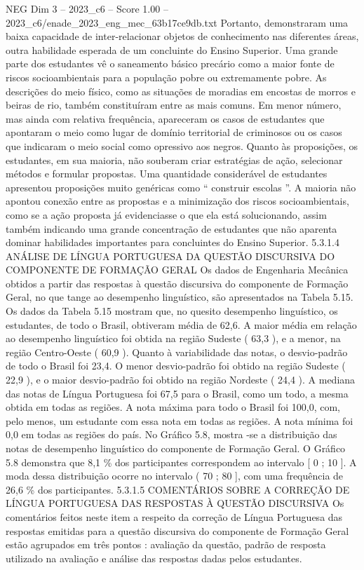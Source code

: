 \begin{textsample}{NEG Dim 3 – 2023\_c6 – Score 1.00 – 2023\_c6/enade\_2023\_eng\_mec\_63b17ce9db.txt}
Portanto, demonstraram uma baixa capacidade de inter-relacionar objetos de conhecimento nas diferentes áreas, outra habilidade esperada de um concluinte do Ensino Superior.
Uma grande parte dos estudantes vê o saneamento básico precário como a maior fonte de riscos socioambientais para a população pobre ou extremamente pobre.
As descrições do meio físico, como as situações de moradias em encostas de morros e beiras de rio, também constituíram entre as mais comuns.
Em menor número, mas ainda com relativa frequência, apareceram os casos de estudantes que apontaram o meio como lugar de domínio territorial de criminosos ou os casos que indicaram o meio social como opressivo aos negros.
Quanto às proposições, os estudantes, em sua maioria, não souberam criar estratégias de ação, selecionar métodos e formular propostas.
Uma quantidade considerável de estudantes apresentou proposições muito genéricas como “ construir escolas ”.
A maioria não apontou conexão entre as propostas e a minimização dos riscos socioambientais, como se a ação proposta já evidenciasse o que ela está solucionando, assim também indicando uma grande concentração de estudantes que não aparenta dominar habilidades importantes para concluintes do Ensino Superior. 5.3.1.4 ANÁLISE DE LÍNGUA PORTUGUESA DA QUESTÃO DISCURSIVA DO COMPONENTE DE FORMAÇÃO GERAL Os dados de Engenharia Mecânica obtidos a partir das respostas à questão discursiva do componente de Formação Geral, no que tange ao desempenho linguístico, são apresentados na Tabela 5.15.
Os dados da Tabela 5.15 mostram que, no quesito desempenho linguístico, os estudantes, de todo o Brasil, obtiveram média de 62,6.
A maior média em relação ao desempenho linguístico foi obtida na região Sudeste ( 63,3 ), e a menor, na região Centro-Oeste ( 60,9 ).
Quanto à variabilidade das notas, o desvio-padrão de todo o Brasil foi 23,4.
O menor desvio-padrão foi obtido na região Sudeste ( 22,9 ), e o maior desvio-padrão foi obtido na região Nordeste ( 24,4 ).
A mediana das notas de Língua Portuguesa foi 67,5 para o Brasil, como um todo, a mesma obtida em todas as regiões.
A nota máxima para todo o Brasil foi 100,0, com, pelo menos, um estudante com essa nota em todas as regiões.
A nota mínima foi 0,0 em todas as regiões do país.
No Gráfico 5.8, mostra -se a distribuição das notas de desempenho linguístico do componente de Formação Geral.
O Gráfico 5.8 demonstra que 8,1 \% dos participantes correspondem ao intervalo [ 0 ; 10 ].
A moda dessa distribuição ocorre no intervalo ( 70 ; 80 ], com uma frequência de 26,6 \% dos participantes. 5.3.1.5 COMENTÁRIOS SOBRE A CORREÇÃO DE LÍNGUA PORTUGUESA DAS RESPOSTAS À QUESTÃO DISCURSIVA Os comentários feitos neste item a respeito da correção de Língua Portuguesa das respostas emitidas para a questão discursiva do componente de Formação Geral estão agrupados em três pontos : avaliação da questão, padrão de resposta utilizado na avaliação e análise das respostas dadas pelos estudantes.

\end{textsample}
